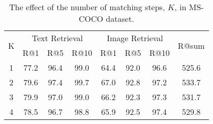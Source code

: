 \documentclass{midl}
\begin{document}
\begin{table}[]
\centering
\caption{The effect of the number of matching steps, $K$, in MS-COCO dataset.}
\label{table-iteration_exp}
\begin{tabular}{@{}cccccccc@{}}
\toprule
\multirow{2}{*}{K} & \multicolumn{3}{c}{Text Retrieval} & \multicolumn{3}{c}{Image Retrieval} & \multirow{2}{*}{R@sum} \\
                   & R@1        & R@5       & R@10      & R@1        & R@5        & R@10      &                        \\ \midrule
1                  & 77.2       & 96.4      & 99.0      & 64.4       & 92.0       & 96.6      & 525.6                  \\
2                  & 79.6       & 97.4      & 99.7      & 67.0       & 92.8       & 97.2      & 533.7                  \\
3                  & 79.9       & 97.0      & 99.0      & 66.2       & 92.3       & 97.3      & 531.7                  \\
4                  & 78.5       & 96.7      & 98.8      & 65.9       & 92.5       & 97.4      & 529.8                  \\ \bottomrule
\end{tabular}\end{table}
\end{document}
